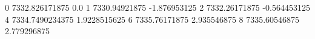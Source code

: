 0 7332.826171875 0.0
1 7330.94921875 -1.876953125
2 7332.26171875 -0.564453125
4 7334.7490234375 1.9228515625
6 7335.76171875 2.935546875
8 7335.60546875 2.779296875
